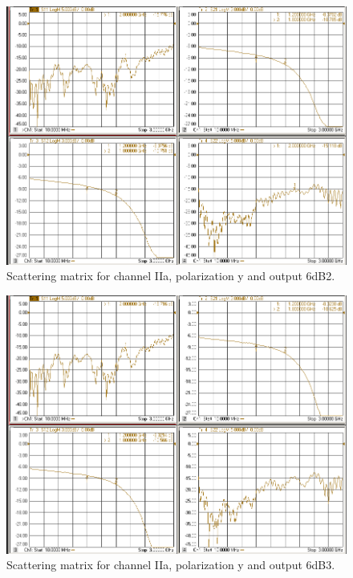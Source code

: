 \documentclass[12pt,a4paper,oneside]{article}
\begin{document}
\begin{figure}[H]
\centering
\includegraphics[width=0.9\linewidth]{VNA_results/IIay_6dB2.png}
\caption{Scattering matrix for channel IIa, polarization y and output 6dB2.}
\label{fig:IIay_6dB2}
\end{figure}


\begin{figure}[H]
\centering
\includegraphics[width=0.9\linewidth]{VNA_results/IIay_6dB3.png}
\caption{Scattering matrix for channel IIa, polarization y and output 6dB3.}
\label{fig:IIay_6dB3}
\end{figure}
\end{document}
